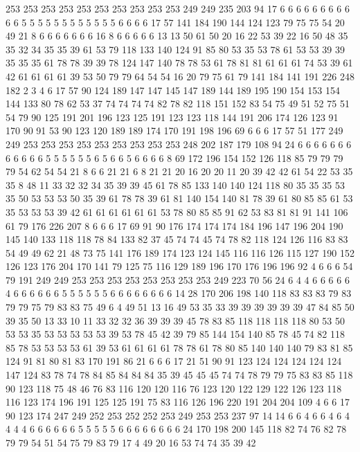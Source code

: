 253 253 253 253 253 253 253 253 253 253 249 249 235 203 94 17 6 6 6 6
6 6 6 6 6 6 6 5 5 5 5 5 5 5 5 5 5 5 5 6
6 6 6 17 57 141 184 190 144 124 123 79 75 75 54 20 49 21 8 6
6 6 6 6 6 6 16 8 6 6 6 6 6 13 13 50 61 50 20 16
22 53 39 22 16 50 48 35 35 32 34 35 35 39 61 53 79 118 133 140
124 91 85 80 53 35 53 78 61 53 53 39 39 35 35 35 61 78 78 39
39 78 124 147 140 78 78 53 61 78 81 81 61 61 61 74 53 39 61 42
61 61 61 61 39 53 50 79 79 64 54 54 16 20 79 75 61 79 141 184
141 191 226 248 182 2 3 4 6 17 57 90 124 189 147 147 145 147 189 144
189 195 190 154 153 154 144 133 80 78 62 53 37 74 74 74 74 82 78 82
118 151 152 83 54 75 49 51 52 75 51 54 79 90 125 191 201 196 123 125
191 123 123 118 144 191 206 174 126 123 91 170 90 91 53 90 123 120 189 189
174 170 191 198 196 69 6 6 6 17 57 51 177 249 249 253 253 253 253 253
253 253 253 253 248 202 187 179 108 94 24 6 6 6 6 6 6 6 6 6
6 6 6 5 5 5 5 5 5 6 5 6 6 5 6 6 6 6 8 69
172 196 154 152 126 118 85 79 79 79 79 54 62 54 54 21 8 6 6 21
21 6 8 21 21 20 16 20 20 11 20 39 42 42 61 54 22 53 35 35
8 48 11 33 32 32 34 35 39 39 45 61 78 85 133 140 140 124 118 80
35 35 35 53 35 50 53 53 53 50 35 39 61 78 78 39 61 81 140 154
140 81 78 39 61 80 85 85 61 53 35 53 53 53 39 42 61 61 61 61
61 61 53 78 80 85 85 91 62 53 83 81 81 91 141 106 61 79 176 226
207 8 6 6 6 17 69 91 90 176 174 174 174 184 196 147 196 204 190 145
140 133 118 118 78 84 133 82 37 45 74 74 45 74 78 82 118 124 126 116
83 83 54 49 49 62 21 48 73 75 141 176 189 174 123 124 145 116 116 126
115 127 190 152 126 123 176 204 170 141 79 125 75 116 129 189 196 170 176 196
196 92 4 6 6 6 54 79 191 249 249 253 253 253 253 253 253 253 253 249
223 70 56 24 6 4 4 6 6 6 6 6 4 6 6 6 6 6 6 5
5 5 5 5 5 6 6 6 6 6 6 6 6 14 28 170 206 198 140 118
83 83 83 79 83 79 79 75 79 83 83 75 49 6 4 49 51 13 16 49
53 35 33 39 39 39 39 39 39 47 84 85 50 39 35 50 13 33 10 11
33 32 32 36 39 39 39 45 78 83 85 118 118 118 118 80 53 50 53 53
35 53 53 53 53 53 39 53 78 45 42 39 79 85 144 154 140 85 78 45
74 82 118 85 78 53 53 53 53 61 39 53 61 61 61 61 78 78 61 78
80 85 140 140 140 79 83 81 85 124 91 81 80 81 83 170 191 86 21 6
6 6 17 21 51 90 91 123 124 124 124 124 124 147 124 83 78 74 78 84
85 84 84 84 35 39 45 45 45 74 74 78 79 79 75 83 83 85 118 90
123 118 75 48 46 76 83 116 120 120 116 76 123 120 122 129 122 126 123 118
116 123 174 196 191 125 125 191 75 83 116 126 196 220 191 204 204 109 4 6
6 17 90 123 174 247 249 252 253 252 252 253 249 253 253 237 97 14 14 6
6 4 6 6 4 6 4 4 4 4 6 6 6 6 6 6 5 5 5 5
5 6 6 6 6 6 6 6 6 24 170 198 200 145 118 82 74 76 82 78
79 79 54 51 54 75 79 83 79 17 4 49 20 16 53 74 74 35 39 42
